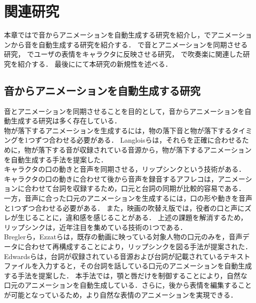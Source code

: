\chapter{関連研究}
\label{chap:previousworks}
本章ではで音からアニメーションを自動生成する研究を紹介し，でアニメーションから音を自動生成する研究を紹介する．
で音とアニメーションを同期させる研究，
でユーザの表情をキャラクタに反映させる研究，
で吹奏楽に関連した研究を紹介する．
最後ににて本研究の新規性を述べる．

\section{音からアニメーションを自動生成する研究}\label{sec:generate_animation}
音とアニメーションを同期させることを目的として，音からアニメーションを自動生成する研究は多く存在している．\\
\indent
物が落下するアニメーションを生成するには，物の落下音と物が落下するタイミングを1つずつ合わせる必要がある．
Langloisら\cite{IFA}は，それらを正確に合わせるために，物が落下する音が収録されている音源から，物が落下するアニメーションを自動生成する手法を提案した．\\
%
\indent
キャラクタの口の動きと音声を同期させる，リップシンクという技術がある．
キャラクタの口の動きに合わせて後から音声を録音するアフレコは，アニメーションに合わせて台詞を収録するため，口元と台詞の同期が比較的容易である．
一方，音声に合った口元のアニメーションを生成するには，口の形や動きを音声と1つずつ合わせる必要がある．
また，映画の吹替え版では，役者の口と声にズレが生じることに，違和感を感じることがある．
上述の課題を解消するため，リップシンクは，近年注目を集めている技術の1つである．\\
\indent
Breglerら\cite{Bregler}，Ezzatら\cite{Ezzat}は，既存の動画に映っている対象人物の口元のみを，音声データに合わせて再構成することにより，リップシンクを図る手法が提案された．
Edwardsら\cite{JALI}は，台詞が収録されている音源および台詞が記載されているテキストファイルを入力すると，その台詞を話している口元のアニメーションを自動生成する手法を提案した．
本手法では，顎と唇だけを制御することにより，自然な口元のアニメーションを自動生成している．さらに，後から表情を編集することが可能となっているため，より自然な表情のアニメーションを実現できる．\\
